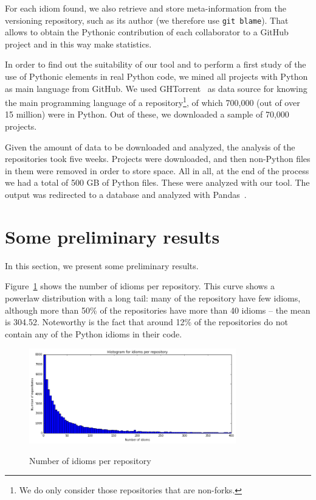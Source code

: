 \documentclass[conference]{IEEEtran}
\begin{document}
For each idiom found, we also retrieve and store meta-information from the versioning repository, such as its author (we therefore use \texttt{git blame}). That allows to obtain the Pythonic contribution of each collaborator to a GitHub project and in this way make statistics.

In order to find out the suitability of our tool and to perform a first study of the use of Pythonic elements in real Python code, we mined all projects with Python as main language from GitHub. We used GHTorrent~\cite{gousios2012ghtorrent} as data source for knowing the main programming language of a repository\footnote{We do only consider those repositories that are non-forks.}, of which 700,000 (out of over 15 million) were in Python. Out of these, we downloaded a sample of 70,000 projects.

Given the amount of data to be downloaded and analyzed, the analysis of the repositories took five weeks. Projects were downloaded, and then non-Python files in them were removed in order to store space. All in all, at the end of the process we had a total of 500 GB of Python files. These were analyzed with our tool. The output was redirected to a database and analyzed with Pandas~\cite{mckinney2012python}.

\section{Some preliminary results}

In this section, we present some preliminary results. 

Figure~\ref{fig:idioms_per_repository} shows the number of idioms per repository. This curve shows a powerlaw distribution with a long tail: many of the repository have few idioms, although more than 50\% of the repositories have more than 40 idioms -- the mean is 304.52. Noteworthy is the fact that around 12\% of the repositories do not contain any of the Python idioms in their code.

\begin{figure}[ht]
\centering  
\includegraphics[width=90mm]{img/idioms_per_repository.png}
\label{fig:idioms_per_repository}
\caption{Number of idioms per repository}
\end{figure}
\end{document}
